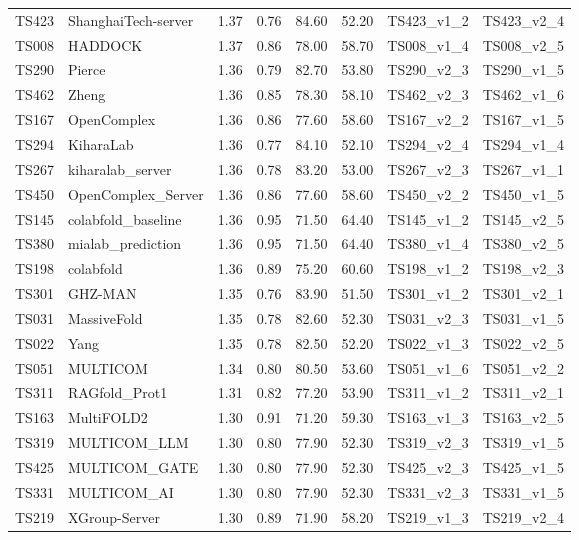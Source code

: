 \begin{longtable}{llllllll}
TS423 & ShanghaiTech-server & 1.37 & 0.76 & 84.60 & 52.20 & TS423\_v1\_2 & TS423\_v2\_4 \\ 
TS008 & HADDOCK & 1.37 & 0.86 & 78.00 & 58.70 & TS008\_v1\_4 & TS008\_v2\_5 \\ 
TS290 & Pierce & 1.36 & 0.79 & 82.70 & 53.80 & TS290\_v2\_3 & TS290\_v1\_5 \\ 
TS462 & Zheng & 1.36 & 0.85 & 78.30 & 58.10 & TS462\_v2\_3 & TS462\_v1\_6 \\ 
TS167 & OpenComplex & 1.36 & 0.86 & 77.60 & 58.60 & TS167\_v2\_2 & TS167\_v1\_5 \\ 
TS294 & KiharaLab & 1.36 & 0.77 & 84.10 & 52.10 & TS294\_v2\_4 & TS294\_v1\_4 \\ 
TS267 & kiharalab\_server & 1.36 & 0.78 & 83.20 & 53.00 & TS267\_v2\_3 & TS267\_v1\_1 \\ 
TS450 & OpenComplex\_Server & 1.36 & 0.86 & 77.60 & 58.60 & TS450\_v2\_2 & TS450\_v1\_5 \\ 
TS145 & colabfold\_baseline & 1.36 & 0.95 & 71.50 & 64.40 & TS145\_v1\_2 & TS145\_v2\_5 \\ 
TS380 & mialab\_prediction & 1.36 & 0.95 & 71.50 & 64.40 & TS380\_v1\_4 & TS380\_v2\_5 \\ 
TS198 & colabfold & 1.36 & 0.89 & 75.20 & 60.60 & TS198\_v1\_2 & TS198\_v2\_3 \\ 
TS301 & GHZ-MAN & 1.35 & 0.76 & 83.90 & 51.50 & TS301\_v1\_2 & TS301\_v2\_1 \\ 
TS031 & MassiveFold & 1.35 & 0.78 & 82.60 & 52.30 & TS031\_v2\_3 & TS031\_v1\_5 \\ 
TS022 & Yang & 1.35 & 0.78 & 82.50 & 52.20 & TS022\_v1\_3 & TS022\_v2\_5 \\ 
TS051 & MULTICOM & 1.34 & 0.80 & 80.50 & 53.60 & TS051\_v1\_6 & TS051\_v2\_2 \\ 
TS311 & RAGfold\_Prot1 & 1.31 & 0.82 & 77.20 & 53.90 & TS311\_v1\_2 & TS311\_v2\_1 \\ 
TS163 & MultiFOLD2 & 1.30 & 0.91 & 71.20 & 59.30 & TS163\_v1\_3 & TS163\_v2\_5 \\ 
TS319 & MULTICOM\_LLM & 1.30 & 0.80 & 77.90 & 52.30 & TS319\_v2\_3 & TS319\_v1\_5 \\ 
TS425 & MULTICOM\_GATE & 1.30 & 0.80 & 77.90 & 52.30 & TS425\_v2\_3 & TS425\_v1\_5 \\ 
TS331 & MULTICOM\_AI & 1.30 & 0.80 & 77.90 & 52.30 & TS331\_v2\_3 & TS331\_v1\_5 \\ 
TS219 & XGroup-Server & 1.30 & 0.89 & 71.90 & 58.20 & TS219\_v1\_3 & TS219\_v2\_4 \\ 

\end{longtable}
